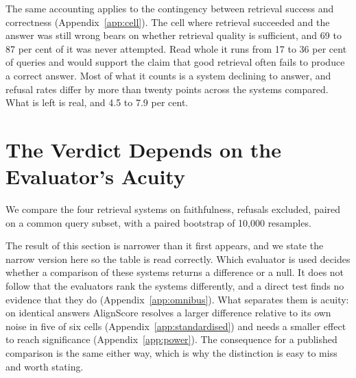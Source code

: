 \documentclass[11pt]{article}
\begin{document}
The same accounting applies to the contingency between retrieval success and correctness (Appendix~\ref{app:cell}). The cell where retrieval succeeded and the answer was still wrong bears on whether retrieval quality is sufficient, and 69 to 87 per cent of it was never attempted. Read whole it runs from 17 to 36 per cent of queries and would support the claim that good retrieval often fails to produce a correct answer. Most of what it counts is a system declining to answer, and refusal rates differ by more than twenty points across the systems compared. What is left is real, and 4.5 to 7.9 per cent.


\section{The Verdict Depends on the Evaluator's Acuity}
\label{sec:verdict}

We compare the four retrieval systems on faithfulness, refusals excluded, paired on a common query subset, with a paired bootstrap of 10,000 resamples.

The result of this section is narrower than it first appears, and we state the narrow version here so the table is read correctly. Which evaluator is used decides whether a comparison of these systems returns a difference or a null. It does not follow that the evaluators rank the systems differently, and a direct test finds no evidence that they do (Appendix~\ref{app:omnibus}). What separates them is acuity: on identical answers AlignScore resolves a larger difference relative to its own noise in five of six cells (Appendix~\ref{app:standardised}) and needs a smaller effect to reach significance (Appendix~\ref{app:power}). The consequence for a published comparison is the same either way, which is why the distinction is easy to miss and worth stating.
\end{document}
